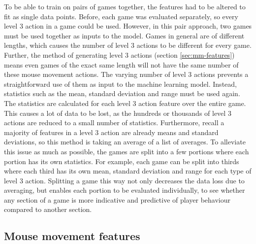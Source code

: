 \documentclass[Report.tex]{subfiles}
\newcommand{\newaxis}[4]{
\begin{axis}[
    ybar,
    title={#1},
    ymin=#3, ymax=#4,
    bar width=1em,
    legend style={at={(0.5,-0.25)},anchor=north,legend columns=-1},
    enlarge x limits=0.4,
    x tick label style={align=center,text width=1.7cm},
    symbolic x coords={Logistic Regression, Random Forest, Multi-layer Perceptron},
    xtick=data,
    ylabel={#2}
]
}
\begin{document}
To be able to train on pairs of games together, the features had to be altered to fit as single data points. Before, each game was evaluated separately, so every level 3 action in a game could be used. However, in this pair approach, two games must be used together as inputs to the model. Games in general are of different lengths, which causes the number of level 3 actions to be different for every game. Further, the method of generating level 3 actions (section \ref{sec:mm-features}) means even games of the exact same length will not have the same number of these mouse movement actions. The varying number of level 3 actions prevents a straightforward use of them as input to the machine learning model. Instead, statistics such as the mean, standard deviation and range must be used again. The statistics are calculated for each level 3 action feature over the entire game. This causes a lot of data to be lost, as the hundreds or thousands of level 3 actions are reduced to a small number of statistics. Furthermore, recall a majority of features in a level 3 action are already means and standard deviations, so this method is taking an average of a list of averages. To alleviate this issue as much as possible, the games are split into a few portions where each portion has its own statistics. For example, each game can be split into thirds where each third has its own mean, standard deviation and range for each type of level 3 action. Splitting a game this way not only decreases the data loss due to averaging, but enables each portion to be evaluated individually, to see whether any section of a game is more indicative and predictive of player behaviour compared to another section.

\subsection{Mouse movement features}


\begin{figure}[H]
\newcommand{\plotbar}[2]{
\addplot+[
	discard if not={split}{1},
	discard if not={numSplits}{1},
	discard if not={features}{mouse},
] table [x=model, y=#1,col sep=comma] {data/15-pair-cv.csv};
\addlegendentry{#2}
}
\centering
{}
\end{figure}
\end{document}
